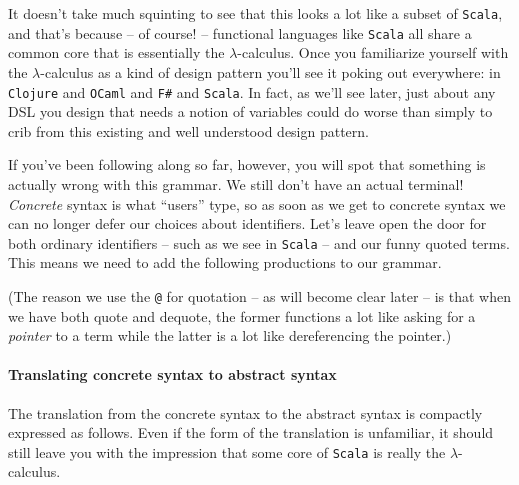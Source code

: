 
It doesn't take much squinting to see that this looks a lot like a
subset of \texttt{Scala}, and that's because -- of course! --
functional languages like \texttt{Scala} all share a common core that
is essentially the $\lambda$-calculus. Once you familiarize yourself
with the $\lambda$-calculus as a kind of design pattern you'll see it
poking out everywhere: in \texttt{Clojure} and \texttt{OCaml} and
\texttt{F\#} and \texttt{Scala}. In fact, as we'll see later, just
about any DSL you design that needs a notion of variables could do
worse than simply to crib from this existing and well understood
design pattern.

If you've been following along so far, however, you will spot that
something is actually wrong with this grammar. We still don't have an
actual terminal! \emph{Concrete} syntax is what ``users'' type, so as
soon as we get to concrete syntax we can no longer defer our choices
about identifiers. Let's leave open the door for both ordinary
identifiers -- such as we see in \texttt{Scala} -- and our funny
quoted terms. This means we need to add the following productions to
our grammar.


(The reason we use the \texttt{@} for quotation -- as will become
clear later -- is that when we have both quote and dequote, the former
functions a lot like asking for a \emph{pointer} to a term while the
latter is a lot like dereferencing the pointer.)

\paragraph{Translating concrete syntax to abstract syntax}
The translation from the concrete syntax to the abstract syntax is
compactly expressed as follows. Even if the form of the translation is
unfamiliar, it should still leave you with the impression that some
core of \texttt{Scala} is really the $\lambda$-calculus.

